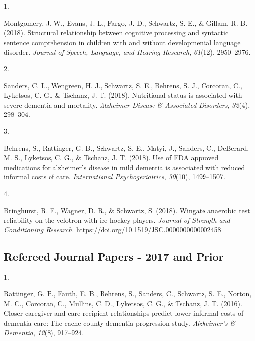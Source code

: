 \documentclass[11pt,a4paper,]{moderncv}
\newlength{\csllabelwidth}
\newcommand{\CSLLeftMargin}[1]{\parbox[t]{\csllabelwidth}{#1}}
\newcommand{\CSLRightInline}[1]{\parbox[t]{\linewidth - \csllabelwidth}{#1}}
\begin{document}
\hypertarget{refs_journals2018}{}
\leavevmode\hypertarget{ref-montgomery2018}{}%
\CSLLeftMargin{1. }
\CSLRightInline{Montgomery, J. W., Evans, J. L., Fargo, J. D., Schwartz,
S. E., \& Gillam, R. B. (2018). Structural relationship between
cognitive processing and syntactic sentence comprehension in children
with and without developmental language disorder. \emph{Journal of
Speech, Language, and Hearing Research}, \emph{61}(12), 2950--2976.}

\leavevmode\hypertarget{ref-sanders2018}{}%
\CSLLeftMargin{2. }
\CSLRightInline{Sanders, C. L., Wengreen, H. J., Schwartz, S. E.,
Behrens, S. J., Corcoran, C., Lyketsos, C. G., \& Tschanz, J. T. (2018).
Nutritional status is associated with severe dementia and mortality.
\emph{Alzheimer Disease \& Associated Disorders}, \emph{32}(4),
298--304.}

\leavevmode\hypertarget{ref-behrens2018}{}%
\CSLLeftMargin{3. }
\CSLRightInline{Behrens, S., Rattinger, G. B., Schwartz, S. E., Matyi,
J., Sanders, C., DeBerard, M. S., Lyketsos, C. G., \& Tschanz, J. T.
(2018). Use of FDA approved medications for alzheimer's disease in mild
dementia is associated with reduced informal costs of care.
\emph{International Psychogeriatrics}, \emph{30}(10), 1499--1507.}

\leavevmode\hypertarget{ref-bringhurst2018}{}%
\CSLLeftMargin{4. }
\CSLRightInline{Bringhurst, R. F., Wagner, D. R., \& Schwartz, S.
(2018). Wingate anaerobic test reliability on the velotron with ice
hockey players. \emph{Journal of Strength and Conditioning Research}.
\url{https://doi.org/10.1519/JSC.0000000000002458}}

\vspace{7mm}

\hypertarget{refereed-journal-papers---2017-and-prior}{%
\subsection{\texorpdfstring{\textbf{Refereed Journal Papers - 2017 and
Prior}}{Refereed Journal Papers - 2017 and Prior}}\label{refereed-journal-papers---2017-and-prior}}

\hypertarget{refs_journals2017}{}
\leavevmode\hypertarget{ref-rattinger2016closer}{}%
\CSLLeftMargin{1. }
\CSLRightInline{Rattinger, G. B., Fauth, E. B., Behrens, S., Sanders,
C., Schwartz, S. E., Norton, M. C., Corcoran, C., Mullins, C. D.,
Lyketsos, C. G., \& Tschanz, J. T. (2016). Closer caregiver and
care-recipient relationships predict lower informal costs of dementia
care: The cache county dementia progression study. \emph{Alzheimer's \&
Dementia}, \emph{12}(8), 917--924.}
\end{document}
